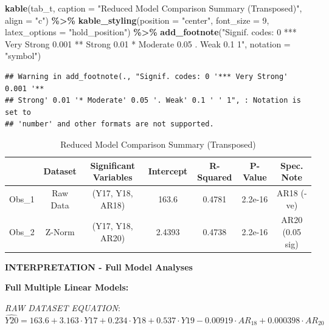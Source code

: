 \documentclass[
]{article}
\newenvironment{Shaded}{\begin{snugshade}}{\end{snugshade}}
\newcommand{\AttributeTok}[1]{\textcolor[rgb]{0.13,0.29,0.53}{#1}}
\newcommand{\DecValTok}[1]{\textcolor[rgb]{0.00,0.00,0.81}{#1}}
\newcommand{\FunctionTok}[1]{\textcolor[rgb]{0.13,0.29,0.53}{\textbf{#1}}}
\newcommand{\NormalTok}[1]{#1}
\newcommand{\SpecialCharTok}[1]{\textcolor[rgb]{0.81,0.36,0.00}{\textbf{#1}}}
\newcommand{\StringTok}[1]{\textcolor[rgb]{0.31,0.60,0.02}{#1}}
\begin{document}
\begin{Shaded}
\begin{Highlighting}[]
\FunctionTok{kable}\NormalTok{(tab\_t, }
      \AttributeTok{caption =} \StringTok{"Reduced Model Comparison Summary (Transposed)"}\NormalTok{,}
      \AttributeTok{align =} \StringTok{"c"}\NormalTok{) }\SpecialCharTok{\%\textgreater{}\%}
  \FunctionTok{kable\_styling}\NormalTok{(}\AttributeTok{position =} \StringTok{"center"}\NormalTok{, }\AttributeTok{font\_size =} \DecValTok{9}\NormalTok{, }\AttributeTok{latex\_options =} \StringTok{"hold\_position"}\NormalTok{) }\SpecialCharTok{\%\textgreater{}\%}
  \FunctionTok{add\_footnote}\NormalTok{(}\StringTok{"Signif. codes: 0 \textquotesingle{}*** Very Strong\textquotesingle{} 0.001 \textquotesingle{}** Strong\textquotesingle{} 0.01 \textquotesingle{}* Moderate\textquotesingle{} 0.05 \textquotesingle{}. Weak\textquotesingle{} 0.1 \textquotesingle{} \textquotesingle{} 1"}\NormalTok{,}
               \AttributeTok{notation =} \StringTok{"symbol"}\NormalTok{)}
\end{Highlighting}
\end{Shaded}

\begin{verbatim}
## Warning in add_footnote(., "Signif. codes: 0 '*** Very Strong' 0.001 '**
## Strong' 0.01 '* Moderate' 0.05 '. Weak' 0.1 ' ' 1", : Notation is set to
## 'number' and other formats are not supported.
\end{verbatim}

\begingroup\fontsize{9}{11}\selectfont

\begin{longtable}[t]{lcccccc}
\caption{\label{tab:unnamed-chunk-15}Reduced Model Comparison Summary (Transposed)}\\
\toprule
 & Dataset & Significant Variables & Intercept & R-Squared & P-Value & Spec. Note\\
\midrule
Obs\_1 & Raw Data & (Y17, Y18, AR18) & 163.6 & 0.4781 & 2.2e-16 & AR18 (-ve)\\
Obs\_2 & Z-Norm & (Y17, Y18, AR20) & 2.4393 & 0.4738 & 2.2e-16 & AR20 (0.05 sig)\\
\bottomrule
\end{longtable}
\endgroup{}

\textbf{INTERPRETATION - Full Model Analyses}

\textbf{Full Multiple Linear Models:}

\emph{RAW DATASET EQUATION}: \[
\hat{Y20} = 163.6 + 3.163 \cdot Y17 + 0.234 \cdot Y18 + 0.537 \cdot Y19 - 0.00919 \cdot AR_18 + 0.000398 \cdot AR_20
\]
\end{document}
